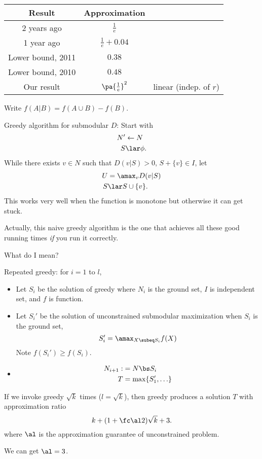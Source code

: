  
\begin{tabular}{|c|c|c|}
\hline 
Result & Approximation & \tabularnewline
\hline 
2 years ago & $\frac{1}{e}$ & \tabularnewline
\hline 
1 year ago & $\frac{1}{e}+0.04$ & \tabularnewline
\hline 
Lower bound, 2011 & $0.38$ & \tabularnewline
\hline 
Lower bound, 2010 & $0.48$ & \tabularnewline
\hline 
Our result & $\pa{\frac{1}{e}}^{2}$ & linear (indep. of $r$)\tabularnewline
\hline 
\end{tabular}

Write $f(A|B) = f(A\cup B)-f(B)$.

Greedy algorithm for submodular $D$: Start with
\begin{align}
N'&\leftarrow N\\
S&\lar \phi.
\end{align}
While there exists $v\in N$ such that  $D(v|S)>0$, $S+\{v\}\in I$, let
\begin{align}
U &= \amax_v D(v|S)\\
S&\lar S\cup \{v\}.
\end{align}
This works very well when the function is monotone but otherwise it can get stuck.

Actually, this naive greedy algorithm is the one that achieves all these good running times \emph{if} you run it correctly.

What do I mean?

Repeated greedy: for $i=1$ to $l$, 
\begin{itemize}
\item
Let $S_i$ be the solution of greedy where $N_i$ is the ground set, $I$ is independent set, and $f$ is function.
\item
Let $S_i'$ be the solution of unconstrained submodular maximization when $S_i$ is the ground set, 
$$
S_i' = \amax_{X\subeq S_i} f(X)
$$
Note $f(S_i')\ge f(S_i)$.
\item
\begin{align}
N_{i+1}:&= N\bs S_i\\
T&= \max\{S_1',\ldots\}
\end{align}
\end{itemize}

\begin{thm}
If we invoke greedy $\sqrt k$ times ($l=\sqrt k$), then greedy produces a solution $T$  with approximation ratio
$$
k+(1+\fc\al 2)\sqrt k + 3.
$$
where $\al$ is the approximation guarantee of unconstrained problem.
\end{thm}
We can get $\al=3$. %

